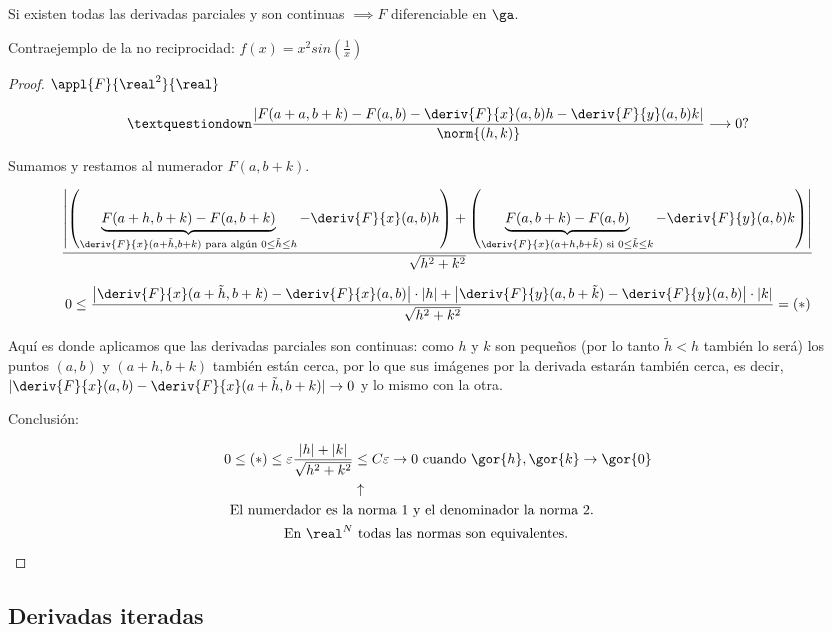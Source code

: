 \begin{theorem}
Si existen todas las derivadas parciales y son continuas $\implies F$ diferenciable en $\ga$.

\end{theorem}

Contraejemplo de la no reciprocidad: $f(x) = x^2 sin\left(\frac{1}{x}\right)$

\begin{proof}
 $\appl{F}{\real^2}{\real}$

 $$¿\frac{\left|F(a+a,b+k) - F(a,b) - \deriv{F}{x}(a,b) h - \deriv{F}{y}(a,b)k\right|}{\norm{(h,k)}}\longrightarrow 0?$$

 Sumamos y restamos al numerador $F(a,b+k)$.

 $$\frac{\left|\left(\underbrace{F(a+h,b+k) - F(a,b+k)}_{\deriv{F}{x}(a+\tilde{h},b+k) \text{ para algún } 0 \leq\tilde{h}\leq h} -  \deriv{F}{x}(a,b) h\right) + \left(\underbrace{F(a,b+k) - F(a,b)}_{\deriv{F}{x}(a+h,b+\tilde{k}) \text{ si } 0 \leq\tilde{k}\leq k}- \deriv{F}{y}(a,b) k\right)\right|}{\sqrt{h^2+k^2}}$$

 $$0\leq\frac{\left|\deriv{F}{x}(a+\tilde{h},b+k)-\deriv{F}{x}(a,b)\right| \cdot |h| + \left| \deriv{F}{y}(a,b+\tilde{k}) - \deriv{F}{y}(a,b)\right| \cdot |k|}{\sqrt{h^2+k^2}} = (*)$$

 Aquí es donde aplicamos que las derivadas parciales son continuas: como $h$ y $k$ son pequeños (por lo tanto $\tilde{h}<h$ también lo será) los puntos $(a,b)$ y $(a+h,b+k)$ también están cerca, por lo que sus imágenes por la derivada estarán también cerca, es decir, $|\deriv{F}{x}(a,b)-\deriv{F}{x}(a+\tilde{h},b+k)| \rightarrow 0$ y lo mismo con la otra.

 Conclusión:

 \begin{align*}
0 \leq (*) \leq \varepsilon \frac{|h|+|k|}{\sqrt{h^2+k^2}} &\leq C\varepsilon \rightarrow 0 \text{ cuando } \gor{h},\gor{k} \rightarrow \gor{0}\\
&\uparrow\\
\text{El numerdador es la} & \text{ norma 1 y el denominador la norma 2.}\\
\text{En } \real^N &\text{ todas las normas son equivalentes.}
 \end{align*}


\end{proof}


\subsection{Derivadas iteradas}

